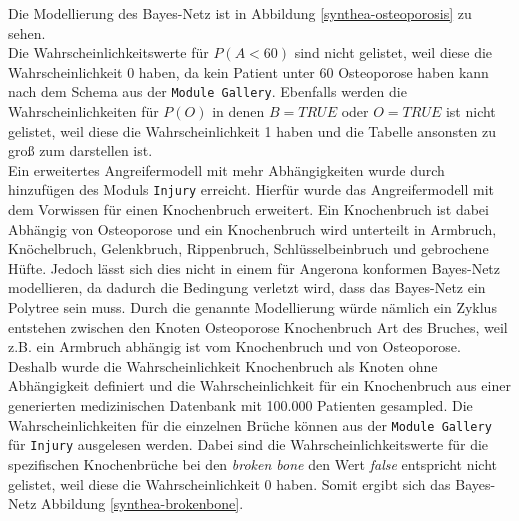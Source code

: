 \documentclass[german,version-2020-11]{uzl-thesis}
\begin{document}
Die Modellierung des Bayes-Netz ist in Abbildung \ref{synthea-osteoporosis} zu sehen.\\ Die Wahrscheinlichkeitswerte für $P(A < 60)$ sind nicht gelistet, weil diese die Wahrscheinlichkeit 0 haben, da kein Patient unter 60 Osteoporose haben kann nach dem Schema aus der \texttt{Module Gallery}. Ebenfalls werden die Wahrscheinlichkeiten für $P(O)$ in denen $B=TRUE$ oder $O=TRUE$ ist nicht gelistet, weil diese die Wahrscheinlichkeit 1 haben und die Tabelle ansonsten zu groß zum darstellen ist.\\
Ein erweitertes Angreifermodell mit mehr Abhängigkeiten wurde durch hinzufügen des Moduls \texttt{Injury} erreicht. Hierfür wurde das Angreifermodell mit dem Vorwissen für einen Knochenbruch erweitert. Ein Knochenbruch ist dabei Abhängig von Osteoporose und ein Knochenbruch wird unterteilt in Armbruch, Knöchelbruch, Gelenkbruch, Rippenbruch, Schlüsselbeinbruch und gebrochene Hüfte. Jedoch lässt sich dies nicht in einem für Angerona konformen Bayes-Netz modellieren, da dadurch die Bedingung verletzt wird, dass das Bayes-Netz ein Polytree sein muss. Durch die genannte Modellierung würde nämlich ein Zyklus entstehen zwischen den Knoten Osteoporose \leftrightarrow Knochenbruch \leftrightarrow Art des Bruches, weil z.B. ein Armbruch abhängig ist vom Knochenbruch und von Osteoporose. 
Deshalb wurde die Wahrscheinlichkeit Knochenbruch als Knoten ohne Abhängigkeit definiert und die Wahrscheinlichkeit für ein Knochenbruch aus einer generierten medizinischen Datenbank mit 100.000 Patienten gesampled. Die Wahrscheinlichkeiten für die einzelnen Brüche können aus der \texttt{Module Gallery} für \texttt{Injury} ausgelesen werden. Dabei sind die Wahrscheinlichkeitswerte für die spezifischen Knochenbrüche bei den \textit{broken bone} den Wert \textit{false} entspricht nicht gelistet, weil diese die Wahrscheinlichkeit 0 haben. Somit ergibt sich das Bayes-Netz Abbildung \ref{synthea-brokenbone}.
\end{document}
